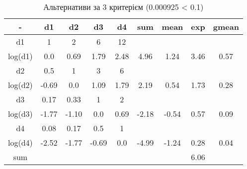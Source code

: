 \begin{table}[!ht]
    \centering
    \caption{Альтернативи за 3 критерієм (0.000925 < 0.1)}
    \label{tab:alternative_priorities3}

    \begin{tabular}{|c||c|c|c|c||c|c|c||c|}
        \toprule
        -       & d1    & d2    & d3    & d4   & sum   & mean  & exp  & gmean \\

        \midrule
        d1      & 1     & 2     & 6     & 12   &       &       &      &       \\
        log(d1) & 0.0   & 0.69  & 1.79  & 2.48 & 4.96  & 1.24  & 3.46 & 0.57  \\
        \hline
        d2      & 0.5   & 1     & 3     & 6    &       &       &      &       \\
        log(d2) & -0.69 & 0.0   & 1.09  & 1.79 & 2.19  & 0.54  & 1.73 & 0.28  \\
        \hline
        d3      & 0.17  & 0.33  & 1     & 2    &       &       &      &       \\
        log(d3) & -1.77 & -1.10 & 0.0   & 0.69 & -2.18 & -0.54 & 0.57 & 0.09  \\
        \hline
        d4      & 0.08  & 0.17  & 0.5   & 1    &       &       &      &       \\
        log(d4) & -2.52 & -1.77 & -0.69 & 0.0  & -4.99 & -1.24 & 0.28 & 0.04  \\

        \bottomrule
        sum     &       &       &       &      &       &       & 6.06 &       \\
        \hline
    \end{tabular}
\end{table}

